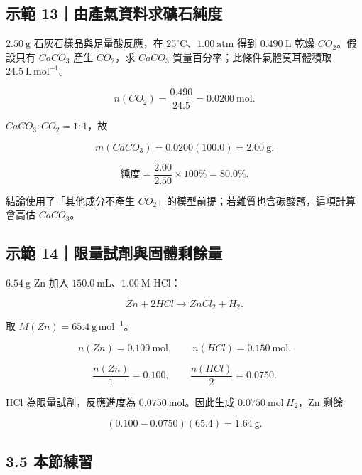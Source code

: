 \documentclass[11pt,a4paper]{article}
\begin{document}
\begin{HandoutWorkedExample}

\subsection{示範 13｜由產氣資料求礦石純度}\label{ux793aux7bc4-13ux7531ux7522ux6c23ux8cc7ux6599ux6c42ux7926ux77f3ux7d14ux5ea6}

\(2.50\ \mathrm g\) 石灰石樣品與足量酸反應，在 \(25^\circ\mathrm C\)、\(1.00\ \mathrm{atm}\) 得到 \(0.490\ \mathrm L\) 乾燥 \(CO_2\)。假設只有 \(CaCO_3\) 產生 \(CO_2\)，求 \(CaCO_3\) 質量百分率；此條件氣體莫耳體積取 \(24.5\ \mathrm{L\,mol^{-1}}\)。

\[
n(CO_2)=\frac{0.490}{24.5}=0.0200\ \mathrm{mol}.
\]

\(CaCO_3:CO_2=1:1\)，故

\[
m(CaCO_3)=0.0200(100.0)=2.00\ \mathrm g.
\]

\[
\text{純度}=\frac{2.00}{2.50}\times100\%=80.0\%.
\]

結論使用了「其他成分不產生 \(CO_2\)」的模型前提；若雜質也含碳酸鹽，這項計算會高估 \(CaCO_3\)。

\end{HandoutWorkedExample}

\begin{HandoutWorkedExample}

\subsection{示範 14｜限量試劑與固體剩餘量}\label{ux793aux7bc4-14ux9650ux91cfux8a66ux5291ux8207ux56faux9ad4ux5269ux9918ux91cf}

\(6.54\ \mathrm g\) Zn 加入 \(150.0\ \mathrm{mL}\)、\(1.00\ \mathrm M\) HCl：

\[
Zn+2HCl\rightarrow ZnCl_2+H_2.
\]

取 \(M(Zn)=65.4\ \mathrm{g\,mol^{-1}}\)。

\[
n(Zn)=0.100\ \mathrm{mol},\qquad n(HCl)=0.150\ \mathrm{mol}.
\]

\[
\frac{n(Zn)}1=0.100,
\qquad
\frac{n(HCl)}2=0.0750.
\]

HCl 為限量試劑，反應進度為 \(0.0750\ \mathrm{mol}\)。因此生成 \(0.0750\ \mathrm{mol}\ H_2\)，Zn 剩餘

\[
(0.100-0.0750)(65.4)=1.64\ \mathrm g.
\]

\end{HandoutWorkedExample}

\subsection{3.5 本節練習}\label{ux672cux7bc0ux7df4ux7fd2-2}
\end{document}
